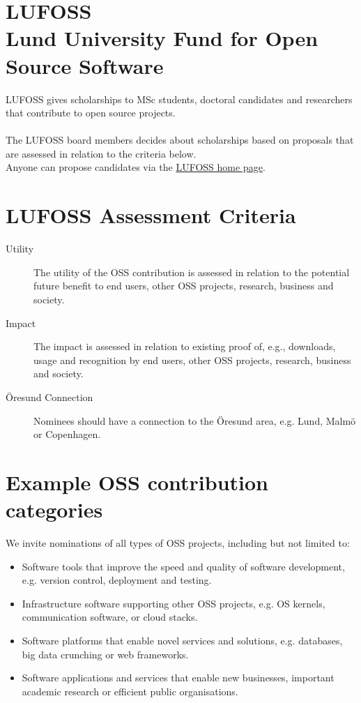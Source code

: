 \documentclass[a4paper,oneside]{report}
\begin{document}
\Large
\section*{LUFOSS\\Lund University Fund for Open Source Software}
LUFOSS gives scholarships to MSc students, doctoral candidates and researchers that contribute to open source projects. 
\\ \\The LUFOSS board members decides about scholarships based on proposals that are assessed in relation to the criteria below. \\Anyone can propose candidates via the \href{https://github.com/bjornregnell/lufoss}{LUFOSS home page}. 

\section*{LUFOSS Assessment Criteria}
\begin{description}
\item[Utility] The utility of the OSS contribution is assessed in relation to the potential future benefit to end users, other OSS projects, research, business and society.
\item[Impact] The impact is assessed in relation to existing proof of, e.g., downloads, usage and recognition by end users, other OSS projects, research, business and society.  
\item[Öresund Connection] Nominees should have a connection to the Öresund area, e.g. Lund, Malmö or Copenhagen.
\end{description}

\section*{Example OSS contribution categories}
We invite nominations of all types of OSS projects, including but not limited to:
\begin{itemize}
\item Software tools that improve the speed and quality of software development, e.g. version control,  deployment and testing.
\item Infrastructure software supporting other OSS projects, e.g. OS kernels, communication software, or cloud stacks.
\item Software platforms that enable novel services and solutions, e.g. databases, big data crunching or web frameworks.
\item Software applications and services that enable new businesses, important academic research or efficient public organisations. 
\end{itemize} 
\end{document}
